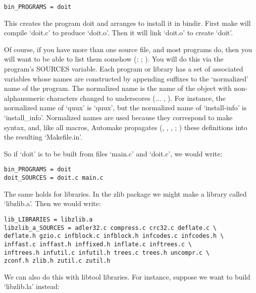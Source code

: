 \begin{Verbatim}[frame=single]
bin_PROGRAMS = doit
\end{Verbatim}
 This creates the program doit and arranges to install it in bindir. First make will compile `doit.c' to produce `doit.o'. Then it will link `doit.o' to create `doit'. 


Of course, if you have more than one source file, and most programs do,
then you will want to be able to list them 
somehow ({\MaQ{}}; {\MbQ{}}; {\MbQ{}}). You will do this via 
the program's SOURCES variable. Each program or library has a set of 
associated variables whose names are constructed by appending suffixes to 
the `normalized' name of the program. The normalized name is the name of 
the object with non-alphanumeric characters changed to 
underscores ({\MaQ{}}... {\MaQ{}}, {\MbQ{}}). For 
instance, the normalized name of `quux' is `quux', but the normalized name 
of `install-info' is `install\_{}info'. Normalized names are used because 
they correspond to make syntax, and, like all macros, Automake 
propagates ({\MhQ{}}, {\MaQ{}}, {\MaQ{}}, {\MaQ{}}; {\MaQ{}}) these 
definitions into the resulting `Makefile.in'. 


So if `doit' is to be built from files `main.c' and `doit.c', we would write: 

\begin{Verbatim}[frame=single]
bin_PROGRAMS = doit
doit_SOURCES = doit.c main.c
\end{Verbatim}

The same holds for libraries. In the zlib package we might make a library called `libzlib.a'. Then we would write: 

\begin{Verbatim}[frame=single]
lib_LIBRARIES = libzlib.a
libzlib_a_SOURCES = adler32.c compress.c crc32.c deflate.c \
deflate.h gzio.c infblock.c infblock.h infcodes.c infcodes.h \
inffast.c inffast.h inffixed.h inflate.c inftrees.c \
inftrees.h infutil.c infutil.h trees.c trees.h uncompr.c \
zconf.h zlib.h zutil.c zutil.h
\end{Verbatim}

We can also do this with libtool libraries. For instance, suppose we want to build `libzlib.la' instead: 

